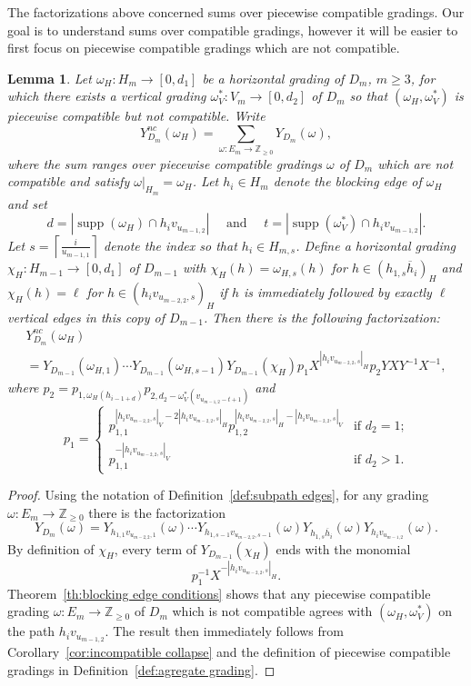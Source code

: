 \documentclass[10pt]{amsart}
\newtheorem{lemma}[theorem]{Lemma}
\theoremstyle{definition}
\newcommand{\ZZ}{\mathbb{Z}}
\DeclareMathOperator{\supp}{supp}
\begin{document}
The factorizations above concerned sums over piecewise compatible gradings. Our goal is to understand sums over compatible gradings, however it will be easier to first focus on piecewise compatible gradings which are not compatible.
\begin{lemma}
 \label{le:incompatible factorization 1}
 Let $\omega_H:H_m\to[0,d_1]$ be a horizontal grading of $D_m$, $m\ge3$, for which there exists a vertical grading $\omega^*_V:V_m\to[0,d_2]$ of $D_m$ so that $(\omega_H,\omega^*_V)$ is piecewise compatible but not compatible.
 Write 
 \[Y_{D_m}^{nc}(\omega_H)=\sum\limits_{\omega:E_m\to\ZZ_{\ge0}}Y_{D_m}(\omega),\]
 where the sum ranges over piecewise compatible gradings $\omega$ of $D_m$ which are not compatible and satisfy $\omega|_{H_m}=\omega_H$.
 Let $h_i\in H_m$ denote the blocking edge of $\omega_H$ and set 
 \[d=|\supp(\omega_H)\cap h_iv_{u_{m-1,2}}|\quad\text{ and }\quad t=|\supp(\omega^*_V)\cap h_iv_{u_{m-1,2}}|.\]
 Let $s=\left\lceil\frac{i}{u_{m-1,1}}\right\rceil$ denote the index so that $h_i\in H_{m,s}$.
 Define a horizontal grading $\chi_H:H_{m-1}\to[0,d_1]$ of $D_{m-1}$ with $\chi_H(h)=\omega_{H,s}(h)$ for $h\in (h_{1,s}\overline{h}_i)_H$ and $\chi_H(h)=\ell$ for $h\in (h_iv_{u_{m-2,2},s})_H$ if $h$ is immediately followed by exactly $\ell$ vertical edges in this copy of $D_{m-1}$.
 Then there is the following factorization:
 \begin{multline}
 \label{eq:incompatible factorization 1}
 Y_{D_m}^{nc}(\omega_H)\\
 =Y_{D_{m-1}}(\omega_{H,1})\cdots Y_{D_{m-1}}(\omega_{H,s-1})Y_{D_{m-1}}(\chi_H)p_1X^{|h_iv_{u_{m-2,2},s}|_H} p_2YXY^{-1}X^{-1},
 \end{multline}
 where $p_2=p_{1,\omega_H(h_{i-1+d})}p_{2,d_2-\omega^*_V(v_{u_{m-1,2}-t+1})}$ and
 \[p_1=\begin{cases} p_{1,1}^{|h_iv_{u_{m-2,2},s}|_V-2|h_iv_{u_{m-2,2},s}|_H}p_{1,2}^{|h_iv_{u_{m-2,2},s}|_H-|h_iv_{u_{m-2,2},s}|_V} & \text{if $d_2=1$;}\\ 
 p_{1,1}^{-|h_iv_{u_{m-2,2},s}|_V} & \text{if $d_2>1$.}\end{cases}\]
\end{lemma}
\begin{proof}
 Using the notation of Definition~\ref{def:subpath edges}, for any grading $\omega:E_m\to\ZZ_{\ge0}$ there is the factorization
 \[
 Y_{D_m}(\omega)=Y_{h_{1,1}v_{u_{m-2,2},1}}(\omega)\cdots Y_{h_{1,s-1}v_{u_{m-2,2},s-1}}(\omega)Y_{h_{1,s}\overline{h}_i}(\omega)Y_{h_iv_{u_{m-1,2}}}(\omega).
 \]
 By definition of $\chi_H$, every term of $Y_{D_{m-1}}(\chi_H)$ ends with the monomial 
 \[
 p_1^{-1}X^{-|h_iv_{u_{m-2,2},s}|_H}.
 \]
 Theorem~\ref{th:blocking edge conditions} shows that any piecewise compatible grading $\omega:E_m\to\ZZ_{\ge0}$ of $D_m$ which is not compatible agrees with $(\omega_H,\omega^*_V)$ on the path $h_iv_{u_{m-1,2}}$.
 The result then immediately follows from Corollary~\ref{cor:incompatible collapse} and the definition of piecewise compatible gradings in Definition~\ref{def:agregate grading}.
\end{proof}
\end{document}
